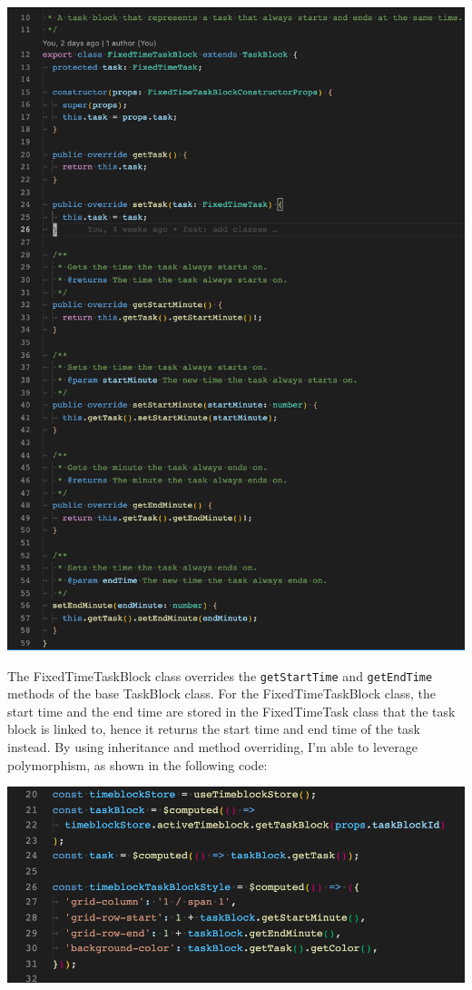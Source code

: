 \documentclass[notitlepage, 12pt]{report}
\newcommand{\code}[1]{\texttt{#1}}
\begin{document}
\includegraphics[width=1\textwidth]{inheritance.png}

The FixedTimeTaskBlock class overrides the \code{getStartTime} and \code{getEndTime} methods of the base TaskBlock class. For the FixedTimeTaskBlock class, the start time and the end time are stored in the FixedTimeTask class that the task block is linked to, hence it returns the start time and end time of the task instead. By using inheritance and method overriding, I'm able to leverage polymorphism, as shown in the following code:

\includegraphics[width=1\textwidth]{polymorphism.png}
\end{document}
